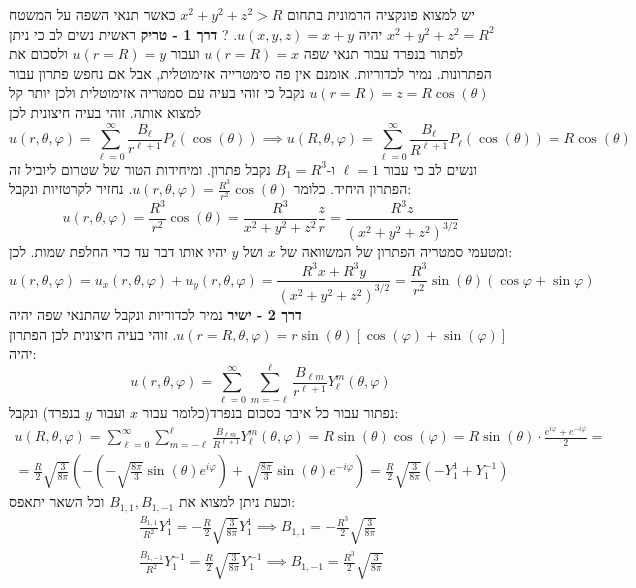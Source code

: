 \documentclass{tstextbook}
\begin{document}
יש למצוא פונקציה הרמונית בתחום \(x^2+y^2+z^2>R\) כאשר תנאי השפה על המשטח \(x^2+y^2+z^2=R^2\) יהיה \(u(x,y,z)=x+y\).
?
\textbf{דרך 1 - טריק}
ראשית נשים לב כי ניתן לפתור בנפרד עבור תנאי שפה \(u(r=R)=x\) ועבור \(u(r=R)=y\) ולסכום את הפתרונות. נמיר לכדוריות. אומנם אין פה סימטרייה אזימוטלית, אבל אם נחפש פתרון עבור \(u(r=R)=z=R\cos\left( \theta \right)\) נקבל כי זוהי בעיה עם סמטריה אזימוטלית ולכן יותר קל למצוא אותה. זוהי בעיה חיצונית לכן 
$$u\left( r,\theta,\varphi \right)=\sum_{\ell=0}^\infty \frac{B_{\ell}}{r^{\ell+1}}P_{\ell}\left( \cos\left( \theta \right) \right)\implies u\left( R,\theta,\varphi \right)=\sum_{\ell=0}^\infty \frac{B_{\ell}}{R^{\ell+1}}P_{\ell}\left( \cos\left( \theta \right) \right)=R\cos\left( \theta \right)$$
ונשים לב כי עבור \(\ell=1\)  ו-\(B_{1}=R^3\) נקבל פתרון. ומיחידות הטור של שטרום ליוביל זה הפתרון היחיד. כלומר \(u\left( r,\theta,\varphi \right)=\frac{R^3}{r^2}\cos\left( \theta \right)\). נחזיר לקרטזיות ונקבל:
$$u\left( r,\theta,\varphi \right)= \frac{R^3}{r^2}\cos\left( \theta \right)=\frac{R^3}{x^2+y^2+z^2} \frac{z}{r}=\frac{R^3z}{(x^2+y^2+z^2)^{3/2}}$$
ומטעמי סמטריה הפתרון של המשוואה של \(x\) ושל \(y\) יהיו אותו דבר עד כדי החלפת שמות. לכן:
$$u\left( r,\theta,\varphi \right)=u_{x}\left( r,\theta,\varphi \right)+u_{y}\left( r,\theta,\varphi \right)= \frac{R^3x+R^3y}{(x^2+y^2+z^2)^{3/2}}= \frac{R^3}{r^2}\sin\left( \theta \right)\left( \cos \varphi +\sin \varphi\right)$$\textbf{דרך 2 - ישיר}
נמיר לכדוריות ונקבל שהתנאי שפה יהיה \(u\left( r=R, \theta,\varphi \right)=r\sin\left( \theta \right)\left[ \cos\left( \varphi \right)+\sin\left( \varphi \right) \right]\). זוהי בעיה חיצונית לכן הפתרון יהיה:
$$u\left( r,\theta,\varphi \right)=\sum^\infty_{\ell=0}\sum_{m=-\ell}^\ell \frac{B_{\ell m}}{r^{\ell+1}} Y_{\ell}^m\left( \theta,\varphi \right)$$
נפתור עבור כל איבר בסכום בנפרד(כלומר עבור \(x\) ועבור \(y\) בנפרד) ונקבל:
\begin{gather*}u\left( R,\theta,\varphi \right)=\sum^\infty_{\ell=0}\sum_{m=-\ell}^\ell \frac{B_{\ell m}}{R^{\ell+1}} Y_{\ell}^m\left( \theta,\varphi \right)=R\sin\left( \theta  \right)\cos\left( \varphi \right)=R \sin\left( \theta \right)\cdot \frac{ e^{i\varphi}+e^{-i\varphi} }{2}= \\={{\frac{R}{2}}}\sqrt{ \frac{3}{8\pi} }\left(-\left( -{\sqrt{{\frac{8\pi}{3}}}}\sin\left( \theta \right)e^{i\varphi} \right)+{\sqrt{{\frac{8\pi}{3}}}}\sin\left( \theta \right)e^{-i\varphi}\right)=\frac{R}{2}\sqrt{ \frac{3}{8\pi} }(-Y_{1}^1+Y^{-1}_{1})
\end{gather*}
וכעת ניתן למצוא את \(B_{1,1},B_{1,-1}\) וכל השאר יתאפס:
\begin{gather*}\frac{B_{1,1}}{R^2}Y_{1}^1=-\frac{R}{2}\sqrt{ \frac{3}{8\pi} }Y_{1}^1\implies B_{1,1}=-\frac{R^3}{2}\sqrt{ \frac{3}{8\pi} }  \\\frac{B_{1,-1}}{R^2}Y_{1}^{-1}= \frac{R}{2}\sqrt{ \frac{3}{8\pi} }Y_{1}^{-1}\implies B_{1,-1}=\frac{R^3}{2}\sqrt{ \frac{3}{8\pi} }
\end{gather*}
\end{document}
